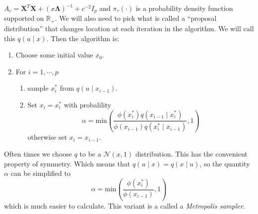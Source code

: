 \documentclass[noinfoline,11pt]{imsart}
\numberwithin{equation}{section}
\theoremstyle{plain}
\newcommand{\X}{\mathbf{X}}
\newcommand{\Bl}{\boldsymbol{\Lambda}}
\begin{document}
$A_c=\X^T\X+\left(x\Bl\right)^{-1}+c^{-2}I_p$ and $\pi_\tau(\cdot)$ is a probability density function supported on $\mathbb{R}_+$.
We will also need to pick what is called a “proposal distribution” that changes location at each iteration in the algorithm. We will call this $q\left(u\mid x\right)$. 
Then the algorithm is:
\begin{enumerate}
    \item Choose some initial value $x_0$.
    \item For $i=1,\cdots,p$
    \begin{enumerate}
        \item sample $x_i^*$ from $q\left(u\mid x_{i-1}\right)$.
        \item Set $x_i=x_i^*$ with probalility
        $$\alpha=\text{min}\left(\frac{\phi(x_i^*) q\left(x_{i-1}\mid x_i^*\right)}{\phi(x_{i-1}) q\left(x_i^*\mid x_{i-1}\right)},1\right)$$
        otherwise set $x_i=x_{i-1}$.
    \end{enumerate}
\end{enumerate}
Often times we choose $q$ to be a $\mathcal{N}(x,1)$ distribution. This has the convenient property of symmetry. Which means that $q\left(u\mid x\right)=q\left(x\mid u\right)$, so the quantity $\alpha$ can be simplified to 
$$\alpha=\text{min}\left(\frac{\phi(x_i^*)}{\phi(x_{i-1})},1\right)$$
which is much easier to calculate. This variant is a called a \emph{Metropolis sampler}.


%


\end{document}

